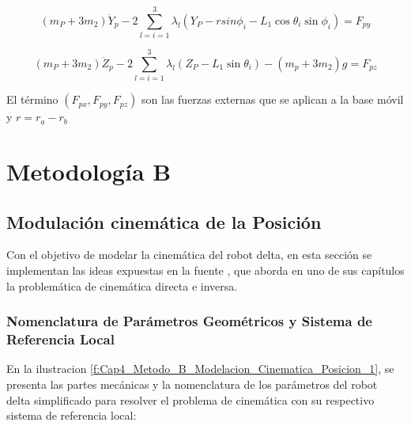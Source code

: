     \begin{equation}
     \left( m_{P}+3m_{2} \right) \ddot{Y}_{p}-2 \sum _{l=i=1}^{3} \lambda _{l} \left( Y_{P}- rsin \phi _{i}-L_{1}\cos  \theta _{i}\sin  \phi _{i} \right) =F_{py} 
        \label{eq:cap4_dina_ma_13}
    \end{equation}

    \begin{equation}
      \left( m_{P}+3m_{2} \right) \ddot{Z}_{p}-2 \sum _{l=i=1}^{3} \lambda _{l} \left( Z_{P}-L_{1}\sin  \theta _{i} \right) - \left( m_{p}+3m_{2} \right) g=F_{pz} 
        \label{eq:cap4_dina_ma_14}
    \end{equation}

    El término $ \left( F_{px},F_{py},F_{pz} \right)$ son las fuerzas externas que se aplican a la base móvil y   $r=r_{a}-r_{b} $







    \newpage


\section{Metodología B}

    \subsection{Modulación cinemática de la Posición}\label{MB_MP}
    
            Con el objetivo de modelar la cinemática del robot delta, en esta sección se implementan las ideas expuestas en la fuente \cite{Path_Planning_and_Trajectory_Optimization}, que aborda en uno de sus capítulos la problemática de cinemática directa e inversa.
    
        \subsubsection{Nomenclatura de Parámetros Geométricos y Sistema de Referencia Local}

            En la ilustracion \ref{f:Cap4_Metodo_B_Modelacion_Cinematica_Posicion_1}, se presenta las partes mecánicas y la nomenclatura de los parámetros del robot delta simplificado para resolver el problema de cinemática con su respectivo sistema de referencia local:

